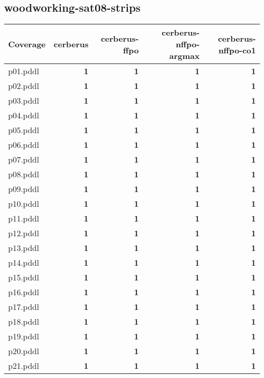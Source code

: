 \documentclass{article}
\begin{document}
\hypertarget{coverage-woodworking-sat08-strips}{}
\subsection*{woodworking-sat08-strips}

\begin{tabular}{@{}lrrrr@{}}
Coverage & cerberus & cerberus-ffpo & cerberus-nffpo-argmax & cerberus-nffpo-co1 \\
\midrule
p01.pddl & \textbf{1} & \textbf{1} & \textbf{1} & \textbf{1} \\
p02.pddl & \textbf{1} & \textbf{1} & \textbf{1} & \textbf{1} \\
p03.pddl & \textbf{1} & \textbf{1} & \textbf{1} & \textbf{1} \\
p04.pddl & \textbf{1} & \textbf{1} & \textbf{1} & \textbf{1} \\
p05.pddl & \textbf{1} & \textbf{1} & \textbf{1} & \textbf{1} \\
p06.pddl & \textbf{1} & \textbf{1} & \textbf{1} & \textbf{1} \\
p07.pddl & \textbf{1} & \textbf{1} & \textbf{1} & \textbf{1} \\
p08.pddl & \textbf{1} & \textbf{1} & \textbf{1} & \textbf{1} \\
p09.pddl & \textbf{1} & \textbf{1} & \textbf{1} & \textbf{1} \\
p10.pddl & \textbf{1} & \textbf{1} & \textbf{1} & \textbf{1} \\
p11.pddl & \textbf{1} & \textbf{1} & \textbf{1} & \textbf{1} \\
p12.pddl & \textbf{1} & \textbf{1} & \textbf{1} & \textbf{1} \\
p13.pddl & \textbf{1} & \textbf{1} & \textbf{1} & \textbf{1} \\
p14.pddl & \textbf{1} & \textbf{1} & \textbf{1} & \textbf{1} \\
p15.pddl & \textbf{1} & \textbf{1} & \textbf{1} & \textbf{1} \\
p16.pddl & \textbf{1} & \textbf{1} & \textbf{1} & \textbf{1} \\
p17.pddl & \textbf{1} & \textbf{1} & \textbf{1} & \textbf{1} \\
p18.pddl & \textbf{1} & \textbf{1} & \textbf{1} & \textbf{1} \\
p19.pddl & \textbf{1} & \textbf{1} & \textbf{1} & \textbf{1} \\
p20.pddl & \textbf{1} & \textbf{1} & \textbf{1} & \textbf{1} \\
p21.pddl & \textbf{1} & \textbf{1} & \textbf{1} & \textbf{1} \\

\end{tabular}
\end{document}
